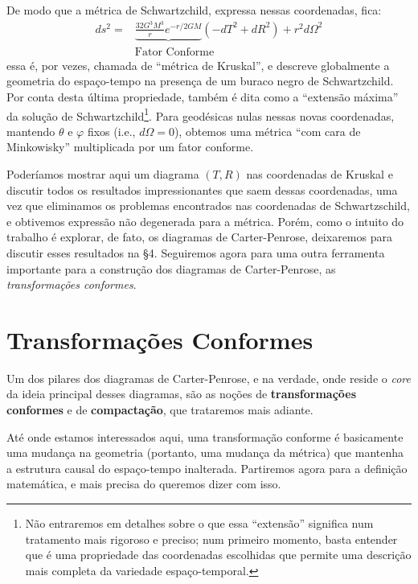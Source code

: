 \documentclass[12pt, a4paper]{article}
\theoremstyle{meuremarkstyle}
\theoremstyle{definicao}
\begin{document}
De modo que a métrica de Schwartzchild, expressa nessas coordenadas, fica:
\begin{align*}
ds^2 = &\underbrace{\frac{32G^3M^3}{r}e^{-r/2GM}}(-dT^2 + dR^2) + r^2d\Omega^2\\
&\text{Fator Conforme}
\end{align*}
essa é, por vezes, chamada de \enquote{métrica de Kruskal}, e descreve globalmente a geometria do espaço-tempo na presença de um buraco negro de Schwartzchild. Por conta desta última propriedade, também é dita como a \enquote{extensão máxima} da solução de Schwartzchild\footnote{Não entraremos em detalhes sobre o que essa \enquote{extensão} significa num tratamento mais rigoroso e preciso; num primeiro momento, basta entender que é uma propriedade das coordenadas escolhidas que permite uma descrição mais completa da variedade espaço-temporal.}. 
Para geodésicas nulas nessas novas coordenadas, mantendo $\theta$ e $\varphi$ fixos (i.e., $d\Omega = 0$), obtemos uma métrica \enquote{com cara de Minkowisky} multiplicada por um fator conforme.

Poderíamos mostrar aqui um diagrama $(T,R)$ nas coordenadas de Kruskal e discutir todos os resultados impressionantes que saem dessas coordenadas, uma vez que eliminamos os problemas encontrados nas coordenadas de Schwartzschild, e obtivemos expressão não degenerada para a métrica. Porém, como o intuito do trabalho é
explorar, de fato, os diagramas de Carter-Penrose, deixaremos para discutir esses resultados na \S4. Seguiremos agora para uma outra ferramenta importante para a construção dos diagramas de Carter-Penrose, as \textit{transformações conformes}.

\section{Transformações Conformes}

Um dos pilares dos diagramas de Carter-Penrose, e na verdade, onde reside o \textit{core}
da ideia principal desses diagramas, são as noções de \textbf{transformações conformes} e de \textbf{compactação}, que trataremos mais adiante.

Até onde estamos interessados aqui, uma transformação conforme é 
basicamente uma mudança na geometria (portanto, uma mudança da métrica) que mantenha a estrutura causal do espaço-tempo
inalterada. Partiremos agora para a definição matemática, e mais precisa do queremos dizer com isso.
\end{document}
